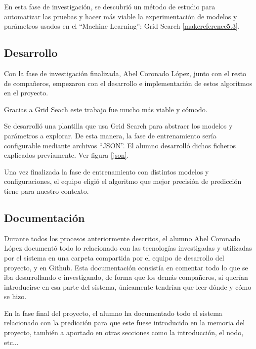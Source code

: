 En esta fase de investigación, se descubrió un método de estudio para automatizar las pruebas y hacer más viable la experimentación de modelos y parámetros usados en el ``Machine Learning'': Grid Search \ref{makereference5.3}.

\subsection{Desarrollo}
Con la fase de investigación finalizada, Abel Coronado López, junto con el resto de compañeros, empezaron con el desarrollo e implementación de estos algoritmos en el proyecto.

Gracias a Grid Seach este trabajo fue mucho más viable y cómodo.

Se desarrolló una plantilla que usa Grid Search para abstraer los modelos y parámetros a explorar. De esta manera, la fase de entrenamiento sería configurable mediante archivos ``JSON''. El alumno desarrolló dichos ficheros explicados previamente. Ver figura \ref{json}.

Una vez finalizada la fase de entrenamiento con distintos modelos y configuraciones, el equipo eligió el algoritmo que mejor precisión de predicción tiene para nuestro contexto.

\subsection{Documentación}
Durante todos los procesos anteriormente descritos, el alumno Abel Coronado López documentó todo lo relacionado con las tecnologías investigadas y utilizadas por el sistema en una carpeta compartida por el equipo de desarrollo del proyecto, y en Github. Esta documentación consistía en comentar todo lo que se iba desarrollando e investigando, de forma que los demás compañeros, si querían introducirse en esa parte del sistema, únicamente tendrían que leer dónde y cómo se hizo.

En la fase final del proyecto, el alumno ha documentado todo el sistema relacionado con la predicción para que este fuese introducido en la memoria del proyecto, también a aportado en otras secciones como la introducción, el nodo, etc...